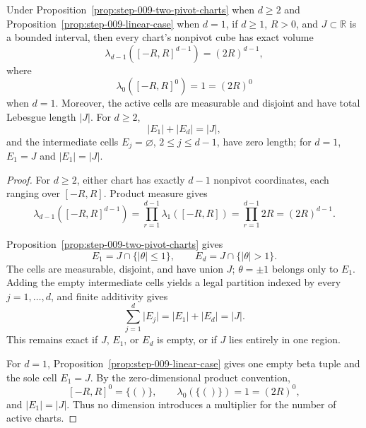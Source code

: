 \begin{lemma}
\label{lem:step-010-measure-accounting}
Under Proposition~\ref{prop:step-009-two-pivot-charts} when \(d\geq2\) and Proposition~\ref{prop:step-009-linear-case} when \(d=1\), if \(d\geq1\), \(R>0\), and \(J\subset\mathbb R\) is a bounded interval, then every chart's nonpivot cube has exact volume
\begin{equation}
\label{eq:appendix-display-314}
\lambda_{d-1}([-R,R]^{d-1})=(2R)^{d-1},
\end{equation}
where
\begin{equation}
\label{eq:appendix-display-315}
\lambda_0([-R,R]^0)=1=(2R)^0
\end{equation}
when \(d=1\). Moreover, the active cells are measurable and disjoint and have total Lebesgue length \(\lvert J\rvert\). For \(d\geq2\),
\begin{equation}
\label{eq:appendix-display-316}
\lvert E_1\rvert+\lvert E_d\rvert=\lvert J\rvert,
\end{equation}
and the intermediate cells \(E_j=\varnothing\), \(2\leq j\leq d-1\), have zero length; for \(d=1\), \(E_1=J\) and \(\lvert E_1\rvert=\lvert J\rvert\).


\end{lemma}

\begin{proof}
For \(d\geq2\), either chart has exactly \(d-1\) nonpivot coordinates, each ranging over \([-R,R]\). Product measure gives
\begin{equation}
\label{eq:appendix-display-317}
\lambda_{d-1}([-R,R]^{d-1})
=\prod_{r=1}^{d-1}\lambda_1([-R,R])
=\prod_{r=1}^{d-1}2R
=(2R)^{d-1}.
\end{equation}

Proposition~\ref{prop:step-009-two-pivot-charts} gives
\begin{equation}
\label{eq:appendix-display-318}
E_1=J\cap\{\lvert\theta\rvert\leq1\},
\qquad
E_d=J\cap\{\lvert\theta\rvert>1\}.
\end{equation}
The cells are measurable, disjoint, and have union \(J\); \(\theta=\pm1\) belongs only to \(E_1\). Adding the empty intermediate cells yields a legal partition indexed by every \(j=1,\ldots,d\), and finite additivity gives
\begin{equation}
\label{eq:appendix-display-319}
\sum_{j=1}^{d}\lvert E_j\rvert
=\lvert E_1\rvert+\lvert E_d\rvert
=\lvert J\rvert.
\end{equation}
This remains exact if \(J\), \(E_1\), or \(E_d\) is empty, or if \(J\) lies entirely in one region.

For \(d=1\), Proposition~\ref{prop:step-009-linear-case} gives one empty beta tuple and the sole cell \(E_1=J\). By the zero-dimensional product convention,
\begin{equation}
\label{eq:appendix-display-320}
[-R,R]^0=\{()\},
\qquad
\lambda_0(\{()\})=1=(2R)^0,
\end{equation}
and \(\lvert E_1\rvert=\lvert J\rvert\). Thus no dimension introduces a multiplier for the number of active charts. 
\end{proof}

